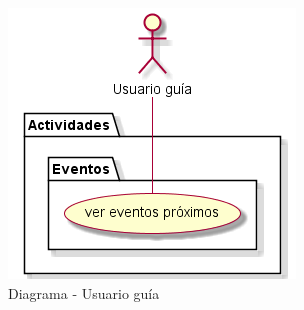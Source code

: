 \begin{figure}[H]
	\centering
	\includegraphics{5-AnalisisDelSistemaDeInformacion//Casos de uso//usuarioGuia/diagrama.png}
	\caption{Diagrama - Usuario guía}
\end{figure}
